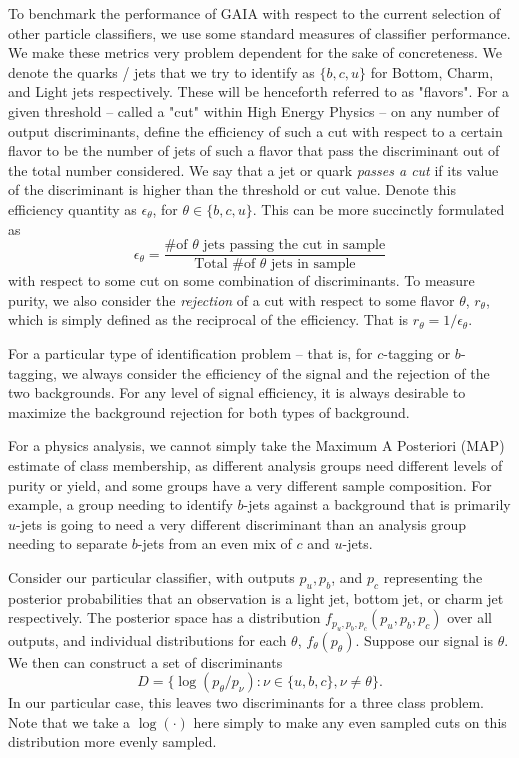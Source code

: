 To benchmark the performance of GAIA with respect to the current selection of other particle classifiers,  we use some standard measures of classifier performance. We make these metrics very problem dependent for the sake of concreteness. We denote the quarks / jets that we try to identify as $\{b,c,u\}$ for Bottom, Charm, and Light jets respectively. These will be henceforth referred to as "flavors". For a given threshold -- called a "cut" within High Energy Physics -- on any number of output discriminants, define the efficiency of such a cut with respect to a certain flavor to be the number of jets of such a flavor that pass the discriminant out of the total number considered. We say that a jet or quark \emph{passes a cut} if its value of the discriminant is higher than the threshold or cut value.  Denote this efficiency quantity as $\epsilon_\theta$, for $\theta\in\{b,c,u\}$. This can be more succinctly formulated as
\begin{equation}
\epsilon_\theta = \frac{\text{\# of }\theta\text{ jets passing the cut in sample}}{\text{Total \# of }\theta\text{ jets in sample}}
\end{equation}
 with respect to some cut on some combination of discriminants. To measure purity, we also consider the \emph{rejection} of a cut with respect to some flavor $\theta$, $r_\theta$, which is simply defined as the reciprocal of the efficiency. That is $r_\theta = 1 / \epsilon_\theta$.
 
For a particular type of identification problem -- that is, for $c$-tagging or $b$-tagging, we always consider the efficiency of the signal and the rejection of the two backgrounds. For any level of signal efficiency, it is always desirable to maximize the background rejection for both types of background. 

For a physics analysis, we cannot simply take the Maximum A Posteriori (MAP) estimate of class membership, as different analysis groups need different levels of purity or yield, and some groups have a very different sample composition. For example, a group needing to identify $b$-jets against a background that is primarily $u$-jets is going to need a very different discriminant than an analysis group needing to separate $b$-jets from an even mix of $c$ and $u$-jets. 

Consider our particular classifier, with outputs $p_u, p_b$, and $p_c$ representing the posterior probabilities that an observation is a light jet, bottom jet, or charm jet respectively. The posterior space has a distribution $f_{p_u,p_b,p_c}(p_u, p_b, p_c)$ over all outputs, and individual distributions for each $\theta$, $f_\theta(p_\theta)$. Suppose our signal is $\theta$. We then can construct a set of discriminants
\begin{equation}
D = \{ \log(p_\theta / p_\nu) : \nu \in \{u,b,c\}, \nu \neq \theta \}.
\end{equation} 
In our particular case, this leaves two discriminants for a three class problem. Note that we take a $\log(\cdot)$ here simply to make any even sampled cuts on this distribution more evenly sampled. 

